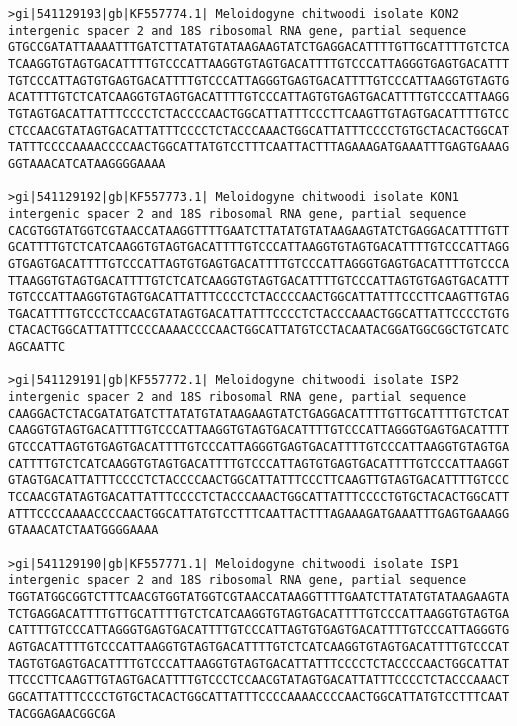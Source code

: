 \documentclass[11pt]{article}
\begin{document}
\begin{Verbatim}[commandchars=\\\{\}]
>gi|541129193|gb|KF557774.1| Meloidogyne chitwoodi isolate KON2 intergenic spacer 2 and 18S ribosomal RNA gene, partial sequence
GTGCCGATATTAAAATTTGATCTTATATGTATAAGAAGTATCTGAGGACATTTTGTTGCATTTTGTCTCA
TCAAGGTGTAGTGACATTTTGTCCCATTAAGGTGTAGTGACATTTTGTCCCATTAGGGTGAGTGACATTT
TGTCCCATTAGTGTGAGTGACATTTTGTCCCATTAGGGTGAGTGACATTTTGTCCCATTAAGGTGTAGTG
ACATTTTGTCTCATCAAGGTGTAGTGACATTTTGTCCCATTAGTGTGAGTGACATTTTGTCCCATTAAGG
TGTAGTGACATTATTTCCCCTCTACCCCAACTGGCATTATTTCCCTTCAAGTTGTAGTGACATTTTGTCC
CTCCAACGTATAGTGACATTATTTCCCCTCTACCCAAACTGGCATTATTTCCCCTGTGCTACACTGGCAT
TATTTCCCCAAAACCCCAACTGGCATTATGTCCTTTCAATTACTTTAGAAAGATGAAATTTGAGTGAAAG
GGTAAACATCATAAGGGGAAAA

>gi|541129192|gb|KF557773.1| Meloidogyne chitwoodi isolate KON1 intergenic spacer 2 and 18S ribosomal RNA gene, partial sequence
CACGTGGTATGGTCGTAACCATAAGGTTTTGAATCTTATATGTATAAGAAGTATCTGAGGACATTTTGTT
GCATTTTGTCTCATCAAGGTGTAGTGACATTTTGTCCCATTAAGGTGTAGTGACATTTTGTCCCATTAGG
GTGAGTGACATTTTGTCCCATTAGTGTGAGTGACATTTTGTCCCATTAGGGTGAGTGACATTTTGTCCCA
TTAAGGTGTAGTGACATTTTGTCTCATCAAGGTGTAGTGACATTTTGTCCCATTAGTGTGAGTGACATTT
TGTCCCATTAAGGTGTAGTGACATTATTTCCCCTCTACCCCAACTGGCATTATTTCCCTTCAAGTTGTAG
TGACATTTTGTCCCTCCAACGTATAGTGACATTATTTCCCCTCTACCCAAACTGGCATTATTCCCCTGTG
CTACACTGGCATTATTTCCCCAAAACCCCAACTGGCATTATGTCCTACAATACGGATGGCGGCTGTCATC
AGCAATTC

>gi|541129191|gb|KF557772.1| Meloidogyne chitwoodi isolate ISP2 intergenic spacer 2 and 18S ribosomal RNA gene, partial sequence
CAAGGACTCTACGATATGATCTTATATGTATAAGAAGTATCTGAGGACATTTTGTTGCATTTTGTCTCAT
CAAGGTGTAGTGACATTTTGTCCCATTAAGGTGTAGTGACATTTTGTCCCATTAGGGTGAGTGACATTTT
GTCCCATTAGTGTGAGTGACATTTTGTCCCATTAGGGTGAGTGACATTTTGTCCCATTAAGGTGTAGTGA
CATTTTGTCTCATCAAGGTGTAGTGACATTTTGTCCCATTAGTGTGAGTGACATTTTGTCCCATTAAGGT
GTAGTGACATTATTTCCCCTCTACCCCAACTGGCATTATTTCCCTTCAAGTTGTAGTGACATTTTGTCCC
TCCAACGTATAGTGACATTATTTCCCCTCTACCCAAACTGGCATTATTTCCCCTGTGCTACACTGGCATT
ATTTCCCCAAAACCCCAACTGGCATTATGTCCTTTCAATTACTTTAGAAAGATGAAATTTGAGTGAAAGG
GTAAACATCTAATGGGGAAAA

>gi|541129190|gb|KF557771.1| Meloidogyne chitwoodi isolate ISP1 intergenic spacer 2 and 18S ribosomal RNA gene, partial sequence
TGGTATGGCGGTCTTTCAACGTGGTATGGTCGTAACCATAAGGTTTTGAATCTTATATGTATAAGAAGTA
TCTGAGGACATTTTGTTGCATTTTGTCTCATCAAGGTGTAGTGACATTTTGTCCCATTAAGGTGTAGTGA
CATTTTGTCCCATTAGGGTGAGTGACATTTTGTCCCATTAGTGTGAGTGACATTTTGTCCCATTAGGGTG
AGTGACATTTTGTCCCATTAAGGTGTAGTGACATTTTGTCTCATCAAGGTGTAGTGACATTTTGTCCCAT
TAGTGTGAGTGACATTTTGTCCCATTAAGGTGTAGTGACATTATTTCCCCTCTACCCCAACTGGCATTAT
TTCCCTTCAAGTTGTAGTGACATTTTGTCCCTCCAACGTATAGTGACATTATTTCCCCTCTACCCAAACT
GGCATTATTTCCCCTGTGCTACACTGGCATTATTTCCCCAAAACCCCAACTGGCATTATGTCCTTTCAAT
TACGGAGAACGGCGA


\end{Verbatim}
\end{document}
